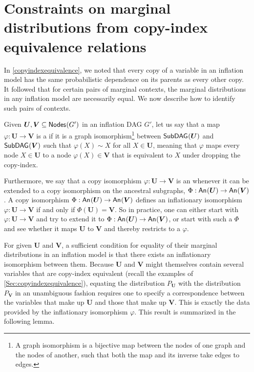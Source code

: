\documentclass[aps,english,superscriptaddress,onecolumn,twoside,longbibliography,pra,floatfix,fleqn,nofootinbib]{revtex4-1}%
\newcommand*{\tblue}[1]{{\color{MidnightBlue}{\textbf{#1}}}}
\theoremstyle{definition}
\newcounter{example}[section]
\newcommand{\An}[2][]{{\mathsf{An}_{#1}}\parenths{#2}}
\newcommand{\SmallNamedFunction}[3][]{\operatorname{\mathsf{#2}}_{#1}\parenths{#3}}
\newcommand{\subgraph}[2][]{\SmallNamedFunction[#1]{SubDAG}{#2}}
\newcommand{\nodes}[1]{\SmallNamedFunction{Nodes}{#1}}
\DeclarePairedDelimiter{\parenths}{\lparen}{\rparen}
\begin{document}
\section{Constraints on marginal distributions from copy-index equivalence relations}\label{sec:coincidingdetails}

In \cref{copyindexequivalence}, we noted that every copy of a variable in an inflation model has the same probabilistic dependence on its parents as every other copy. It followed that for certain pairs of marginal contexts, the marginal distributions in any inflation model are necessarily equal. We now describe how to identify such pairs of contexts. 


Given $\bm{U},\bm{V}\subseteq\nodes{G'}$ in an inflation DAG $G'$, let us say that a map $\varphi:\bm{U}\to\bm{V}$ is a \tblue{copy isomorphism} if it is a graph isomorphism\footnote{A graph isomorphism is a bijective map between the nodes of one graph and the nodes of another, such that both the map and its inverse take edges to edges.} between $\subgraph{\bm{U}}$ and $\subgraph{\bm{V}}$ such that $\varphi(X)\sim X$ for all $X\in\bm{U}$, meaning that $\varphi$ maps every node $X\in\bm{U}$ to a node $\varphi(X)\in\bm{V}$ that is equivalent to $X$ under dropping the copy-index.

Furthermore, we say that a copy isomorphism $\varphi : \bm{U}\to\bm{V}$ is an \tblue{inflationary isomorphism} whenever it can be extended to a copy isomorphism on the ancestral subgraphs, $\Phi : \An{\bm{U}}\to\An{\bm{V}}$. 
A copy isomorphism $\Phi: \An{\bm{U}}\to\An{\bm{V}}$ defines an inflationary isomorphism $\varphi:\bm{U}\to\bm{V}$ if and only if $\Phi(\bm{U}) = \bm{V}$.
So in practice, one can either start with $\varphi : \bm{U}\to\bm{V}$ and try to extend it to $\Phi : \An{\bm{U}}\to\An{\bm{V}}$, or start with such a $\Phi$ and see whether it maps $\bm{U}$ to $\bm{V}$ and thereby restricts to a $\varphi$.

For given $\bm{U}$ and $\bm{V}$, a sufficient condition for equality of their marginal distributions in an inflation model is that there exists an inflationary isomorphism between them.  Because $\bm{U}$ and $\bm{V}$ might themselves contain several variables that are copy-index equivalent (recall the examples of \cref{Sec:copyindexequivalence}), equating the distribution $P_{\bm{U}}$ with the distribution $P_{\bm{V}}$ in an unambiguous fashion requires one to specify a correspondence between the variables that make up $\bm{U}$ and those that make up $\bm{V}$. This is exactly the data provided by the inflationary isomorphism $\varphi$.  This result is summarized in the following lemma.
\end{document}
